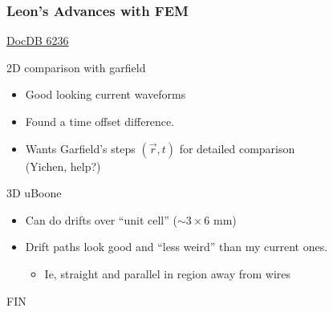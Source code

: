 \documentclass[xcolor=dvipsnames]{beamer}
\begin{document}
\begin{frame}
  \frametitle{Leon's Advances with FEM}
  \begin{center}
    \href{http://microboone-docdb.fnal.gov:8080/cgi-bin/ShowDocument?docid=6236}{DocDB 6236}    
  \end{center}

  2D comparison with garfield
  \begin{itemize}
  \item Good looking current waveforms
  \item Found a time offset difference.
  \item Wants Garfield's steps $(\vec{r},t)$ for detailed comparison\\
    (Yichen, help?)
  \end{itemize}
  3D uBoone
  \begin{itemize}
  \item Can do drifts over ``unit cell'' ($\sim 3\times 6$ mm)
  \item Drift paths look good and ``less weird'' than my current ones.
    \begin{itemize}\footnotesize
    \item Ie, straight and parallel in region away from wires
    \end{itemize}
  \end{itemize}
\end{frame}



\begin{frame}
  \begin{center}
    FIN
  \end{center}
\end{frame}
\end{document}
